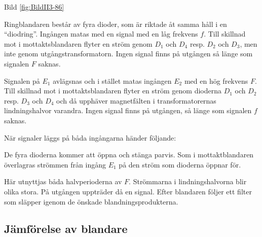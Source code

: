 Bild \ref{fig:BildII3-86}

Ringblandaren består av fyra dioder, som är riktade åt samma håll i en
``diodring''. Ingången matas med en signal med en låg frekvens
\(f\). Till skillnad mot i mottaktsblandaren flyter en ström genom
\(D_1\) och \(D_4\) resp. \(D_2\) och \(D_3\), men inte genom
utgångstransformatorn. Ingen signal finns på utgången så länge som
signalen \(F\) saknas.

Signalen på \(E_1\) avlägsnas och i stället matas ingången \(E_2\) med
en hög frekvens \(F\).  Till skillnad mot i mottaktsblandaren flyter
en ström genom dioderna \(D_1\) och \(D_2\) resp. \(D_3\) och \(D_4\)
och då upphäver magnetfälten i transformatorernas lindningshalvor
varandra. Ingen signal finns på utgången, så länge som signalen \(f\)
saknas.

När signaler läggs på båda ingångarna händer följande:

De fyra dioderna kommer att öppna och stänga parvis. Som i
mottaktblandaren överlagras strömmen från ingång \(E_1\) på den ström
som dioderna öppnar för.

Här utnyttjas båda halvperioderna av \(F\). Strömmarna i
lindningshalvorna blir olika stora. På utgången uppträder då en
signal. Efter blandaren följer ett filter som släpper igenom de
önskade blandningsprodukterna.

\subsection{Jämförelse av blandare}


